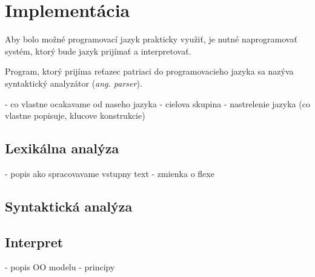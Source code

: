 
\chapter{Implementácia}
Aby bolo možné programovací jazyk prakticky využiť, je nutné naprogramovať systém, ktorý bude jazyk prijímať a interpretovať.

Program, ktorý prijíma reťazec patriaci do programovacieho jazyka sa nazýva
syntaktický analyzátor (\textit{ang. parser}). 



	- co vlastne ocakavame od naseho jazyka
	- cielova skupina
	- nastrelenie jazyka (co vlastne popisuje, klucove konstrukcie)
\section{Lexikálna analýza}
		- popis ako spracovavame vstupny text
		- zmienka o flexe	
\section{Syntaktická analýza}

\section{Interpret}
		- popis OO modelu
		- principy
	
